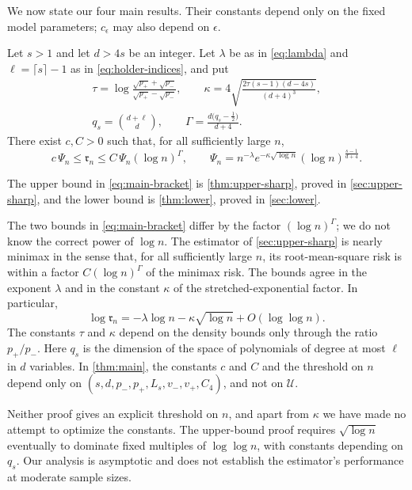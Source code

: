 We now state our four main results. Their constants depend only on the
fixed model parameters; $c_\epsilon$ may also depend on $\epsilon$.
\begin{theorem}\label{thm:main}\label{thm:bracket}
Let $s>1$ and let $d>4s$ be an integer. Let $\lambda$ be as in
\eqref{eq:lambda} and $\ell=\lceil s\rceil-1$ as in
\eqref{eq:holder-indices}, and put
\begin{equation}\label{eq:main-constants}
 \begin{gathered}
 \tau=\log\frac{\sqrt{p_+}+\sqrt{p_-}}{\sqrt{p_+}-\sqrt{p_-}},
 \qquad
 \kappa=4\sqrt{\frac{2\tau(s-1)(d-4s)}{(d+4)^3}},\\
 q_s=\binom{d+\ell}{d},
 \qquad
 \Gamma=\frac{d\bigl(q_s-\frac12\bigr)}{d+4}.
 \end{gathered}
\end{equation}
There exist $c,C>0$ such that, for all sufficiently large $n$,
\begin{equation}\label{eq:main-bracket}
 c\,\Psi_n
 \le\mathfrak r_n\le C\,\Psi_n(\log n)^{\Gamma},
 \qquad
 \Psi_n=n^{-\lambda}e^{-\kappa\sqrt{\log n}}
 (\log n)^{\frac{s-1}{d+4}}.
\end{equation}
\end{theorem}
The upper bound in \eqref{eq:main-bracket} is \cref{thm:upper-sharp},
proved in \cref{sec:upper-sharp}, and the lower bound is
\cref{thm:lower}, proved in \cref{sec:lower}.

The two bounds in \eqref{eq:main-bracket} differ by the factor
$(\log n)^\Gamma$; we do not know the correct power of $\log n$.
The estimator of \cref{sec:upper-sharp} is nearly minimax in the sense
that, for all sufficiently large $n$, its root-mean-square risk is
within a factor $C(\log n)^\Gamma$ of the minimax risk. The bounds agree
in the exponent $\lambda$ and in the constant $\kappa$ of the
stretched-exponential factor. In particular,
\[
 \log\mathfrak r_n=-\lambda\log n-\kappa\sqrt{\log n}+O(\log\log n).
\]
The constants $\tau$ and $\kappa$ depend on the density bounds
only through the ratio $p_+/p_-$. Here $q_s$ is the dimension of the
space of polynomials of degree at most $\ell$ in $d$ variables.
In \cref{thm:main}, the constants $c$ and $C$ and the threshold on $n$
depend only on $(s,d,p_-,p_+,L_s,v_-,v_+,C_4)$, and not on $\mathcal U$.

Neither proof gives an explicit threshold on $n$, and apart from $\kappa$
we have made no attempt to optimize the constants. The upper-bound proof
requires $\sqrt{\log n}$ eventually to dominate fixed multiples of
$\log\log n$, with constants depending on $q_s$. Our analysis is
asymptotic and does not establish the estimator's performance at
moderate sample sizes.

